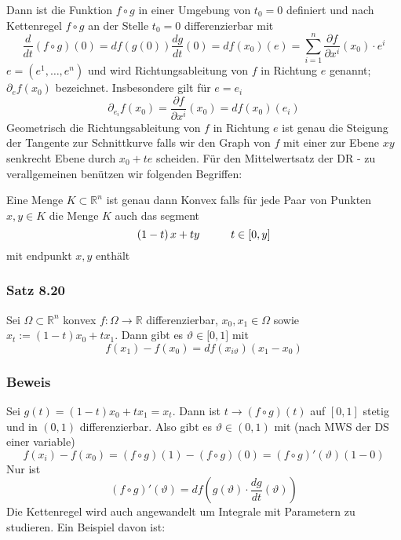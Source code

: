 Dann ist die Funktion $f\circ g$ in einer Umgebung von $t_0=0$ definiert und nach Kettenregel $f\circ g$ an der Stelle $t_0=0$ differenzierbar mit 
\[\frac{d}{{dt}}\left( {f \circ g} \right)\left( 0 \right) = df\left( {g\left( 0 \right)} \right)\frac{{dg}}{{dt}}\left( 0 \right) = df\left( {{x_0}} \right)\left( e \right) = \sum\limits_{i = 1}^n {\frac{{\partial f}}{{\partial {x^i}}}\left( {{x_0}} \right) \cdot {e^i}} \]
$e=\left( e^1,\dots, e^n\right) $ und wird Richtungsableitung von $f$ in Richtung $e$ genannt; $\partial_ef\left( x_0\right)$ bezeichnet. Insbesondere gilt für $e=e_i$
\[{\partial _{{e_i}}}f\left( {{x_0}} \right) = \frac{{\partial f}}{{\partial {x^i}}}\left( {{x_0}} \right) = df\left( {{x_0}} \right)\left( {{e_i}} \right)\]
Geometrisch die Richtungsableitung von $f$ in Richtung $e$ ist genau die Steigung der Tangente zur Schnittkurve falls wir den Graph von $f$ mit einer zur Ebene $xy$ senkrecht Ebene durch $x_0+te$ scheiden.
Für den Mittelwertsatz der DR - zu verallgemeinen benützen wir folgenden Begriffen:
\begin{definition}{8.19}
Eine Menge $K\subset \mathbb{R}^n$ ist genau dann Konvex falls für jede Paar von Punkten $x,y\in K$ die Menge $K$ auch das segment $$\left( 1-t\right) x+ty\hspace{10mm} t\in\lbrack 0,y\rbrack$$ mit endpunkt $x,y$ enthält
\end{definition}
\subsubsection*{Satz 8.20}
Sei $\Omega\subset\mathbb{R}^n$ konvex $f:\Omega\rightarrow\mathbb{R}$ differenzierbar, $x_0,x_1\in\Omega$ sowie $x_t:=\left( 1-t\right) x_0+tx_1$. Dann gibt es $\vartheta\in\lbrack 0,1\rbrack$ mit \[f\left( {{x_1}} \right) - f\left( {{x_0}} \right) = df\left( {{x_{i\vartheta }}} \right)\left( {{x_1} - {x_0}} \right)\]

\subsubsection*{Beweis}
Sei $g\left( t\right) = \left( 1-t\right) x_0+tx_1=x_t$. Dann ist $t\rightarrow \left( f\circ g\right)(t)$ auf $\left[ 0,1\right]$ stetig und in $\left( 0,1\right)$ differenzierbar. Also gibt es $\vartheta\in\left( 0,1\right)$ mit (nach MWS der DS einer variable) \[f\left( {{x_i}} \right) - f\left( {{x_0}} \right) = \left( {f \circ g} \right)(1) - \left( {f \circ g} \right)(0) = \left( {f \circ g} \right)'\left( \vartheta  \right)\left( {1 - 0} \right)\] Nur ist \[\left( {f \circ g} \right)'\left( \vartheta  \right) = df\left( {g\left( \vartheta  \right) \cdot \frac{{dg}}{{dt}}\left( \vartheta  \right)} \right)\] 
Die Kettenregel wird auch angewandelt um Integrale mit Parametern zu studieren. Ein Beispiel davon ist:

